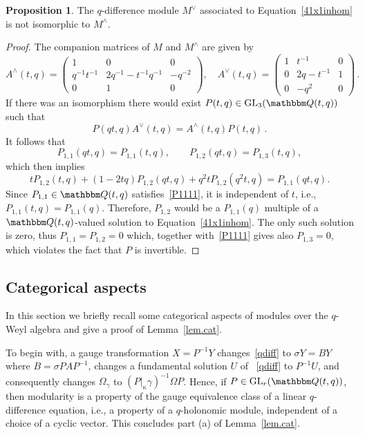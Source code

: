 \documentclass[12pt,reqno]{amsart}
\theoremstyle{definition}
\newtheorem{proposition}[theorem]{Proposition}
\def\BQ{\mathbbm Q}
\def\s{\sigma}
\def\be{\begin{equation}}
\def\ee{\end{equation}}
\def\GL{\mathrm{GL}}
\def\Om{\Omega}
\begin{document}
\begin{proposition}
\label{41inhom.not.sd}
The $q$-difference module $M^{\vee}$ associated to Equation~\eqref{41x1inhom}
is not isomorphic to $M^{\wedge}$. 
\end{proposition}

\begin{proof}
The companion matrices of $M$ and $M^{\wedge}$ are given by
\be
  A^{\wedge}(t,q)
  =
  \begin{pmatrix}
1 & 0 & 0\\
q^{-1}t^{-1} & 2q^{-1}-t^{-1}q^{-1} & -q^{-2}\\
0 & 1 & 0
  \end{pmatrix},
  \quad
  A^{\vee}(t,q)
  =
  \begin{pmatrix}
1 & t^{-1} & 0\\
0 & 2q-t^{-1} & 1\\
0 & -q^{2} & 0
  \end{pmatrix} \,.
\ee
If there was an isomorphism there would exist $P(t,q) \in \GL_3(\BQ(t,q))$
such that
\be
  P(qt,q)A^{\vee}(t,q)=A^{\wedge}(t,q)P(t,q) \,.
\ee
It follows that   
\be
\label{P1111}
  P_{1,1}(qt,q)=P_{1,1}(t,q), \qquad
  P_{1,2}(qt,q)=P_{1,3}(t,q),
\ee
which then implies
\be
  tP_{1,2}(t,q)+(1-2tq)P_{1,2}(qt,q)+q^2tP_{1,2}(q^2t,q)=P_{1,1}(qt,q).
\ee
Since $P_{1,1}\in\BQ(t,q)$ satisfies~\eqref{P1111}, it is independent of $t$,
i.e., $P_{1,1}(t,q)=P_{1,1}(q)$. Therefore, $P_{1,2}$ would be a $P_{1,1}(q)$
multiple of a $\BQ(t,q)$-valued solution to Equation~\eqref{41x1inhom}. The
only such solution is zero, thus $P_{1,1}=P_{1,2}=0$ which, together with~\eqref{P1111}
gives also $P_{1,3}=0$, which violates the fact that $P$ is invertible.
\end{proof}

\subsection{Categorical aspects}
\label{sub.cat}

In this section we briefly recall some categorical aspects of modules over
the $q$-Weyl algebra and give a proof of Lemma~\ref{lem.cat}.

To begin with, a gauge transformation $X=P^{-1}Y$ changes~\eqref{qdiff} to
$\s Y = B Y$ where $B=\s P A P^{-1}$, changes a fundamental solution $U$ of
~\eqref{qdiff} to $P^{-1}U$, and consequently changes $\Om_\gamma$ to
$(P|_{\kappa}\gamma)^{-1} \Om P$. Hence, if $P \in \GL_r(\BQ(t,q))$, then modularity
is a property of the gauge equivalence class of a linear $q$-difference equation,
i.e., a property of a $q$-holonomic module, independent of a choice of a cyclic
vector. This concludes part (a) of Lemma~\ref{lem.cat}.
\end{document}
